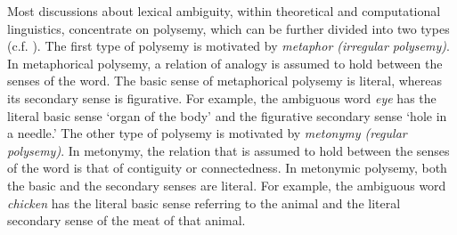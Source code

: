 \documentclass[11pt]{article}
\begin{document}
Most discussions about lexical ambiguity, within theoretical and computational
linguistics, concentrate on polysemy, which can be further divided into two
types (c.f. \cite{Apresjan:1974,Pustejovsky:1995}). The first type of polysemy
is motivated by \emph{metaphor (irregular polysemy)}. In metaphorical polysemy,
a relation of analogy is assumed to hold between the senses of the word. The
basic sense of metaphorical polysemy is literal, whereas its secondary sense is
figurative. For example, the ambiguous word \emph{eye} has the literal basic
sense  `organ of the body' and the figurative secondary sense `hole in a
needle.' The other type of polysemy is motivated by \emph{metonymy (regular
polysemy)}. In metonymy, the relation that is assumed to hold between the
senses of the word is that of contiguity or connectedness.
In metonymic polysemy, both the basic and the secondary senses are literal. For
example, the ambiguous word \emph{chicken} has the literal basic sense
referring to the animal and the literal secondary sense of the meat of that
animal.


%


\end{document}

